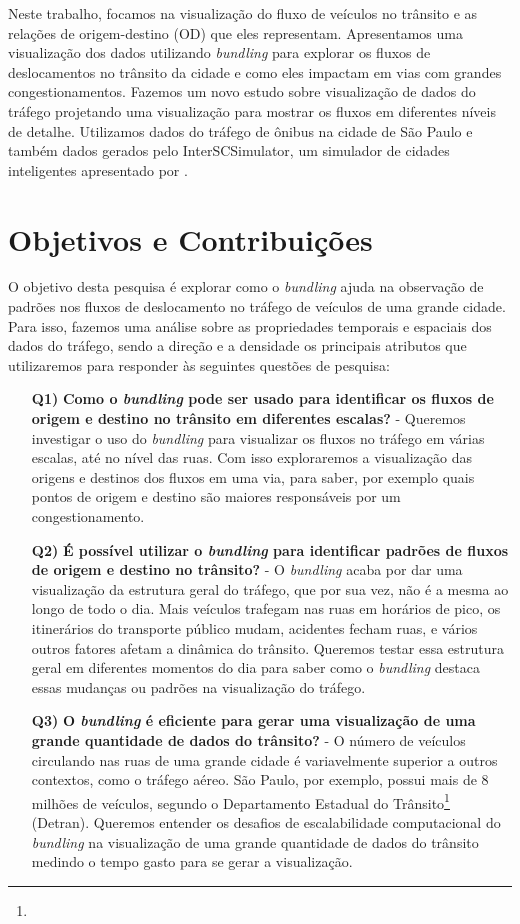   Neste trabalho, focamos na visualização do fluxo de veículos no trânsito e as
relações de origem-destino (OD) que eles representam. Apresentamos uma
visualização dos dados utilizando \emph{bundling} para explorar os fluxos de
deslocamentos no trânsito da cidade e como eles impactam em vias com grandes
congestionamentos. Fazemos um novo estudo sobre visualização de dados do
tráfego projetando uma visualização para mostrar os fluxos em diferentes níveis
de detalhe. Utilizamos dados do tráfego de ônibus na cidade de São Paulo e
também dados gerados pelo InterSCSimulator, um simulador de cidades
inteligentes apresentado por \citet{mabs2017}.

\section{Objetivos e Contribuições}
  O objetivo desta pesquisa é explorar como o \emph{bundling} ajuda na
observação de padrões nos fluxos de deslocamento no tráfego de veículos de uma
grande cidade. Para isso, fazemos uma análise sobre as propriedades temporais e
espaciais dos dados do tráfego, sendo a direção e a densidade os principais
atributos que utilizaremos para responder às seguintes questões de pesquisa:

\begin{itemize}
  \item[\textbf{Q1)}] \textbf{Como o \emph{bundling} pode ser usado para
identificar os fluxos de origem e destino no trânsito em diferentes escalas?} -
Queremos investigar o uso do \emph{bundling} para visualizar os fluxos no
tráfego em várias escalas, até no nível das ruas. Com isso exploraremos
a visualização das origens e destinos dos fluxos em uma via, para saber, por exemplo
quais pontos de origem e destino são maiores responsáveis por um congestionamento.

  \item[\textbf{Q2)}] \textbf{É possível utilizar o \emph{bundling}  para
identificar padrões de fluxos de origem e destino no trânsito?} - O
\emph{bundling} acaba por dar uma visualização da estrutura geral do tráfego,
que por sua vez, não é a mesma ao longo de todo o dia. Mais veículos trafegam
nas ruas em horários de pico, os itinerários do transporte público mudam,
acidentes fecham ruas, e vários outros fatores afetam a dinâmica do trânsito.
Queremos testar essa estrutura geral em diferentes momentos do dia para saber
como o \emph{bundling} destaca essas mudanças ou padrões na visualização do
tráfego.

  \item[\textbf{Q3)}] \textbf{O \emph{bundling} é eficiente para gerar uma
visualização de uma grande quantidade de dados do trânsito?} - O número de
veículos circulando nas ruas de uma grande cidade é variavelmente superior a
outros contextos, como o tráfego aéreo. São Paulo, por exemplo, possui mais de
8 milhões de veículos, segundo o Departamento Estadual do
Trânsito\footnote{} (Detran). Queremos entender os
desafios de escalabilidade computacional do \emph{bundling} na visualização de uma
grande quantidade de dados do trânsito medindo o tempo gasto para se gerar a visualização.
\end{itemize}

